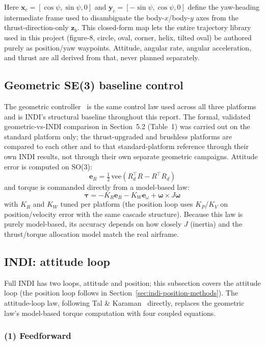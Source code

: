 \documentclass[11pt,a4paper]{article}
\begin{document}
Here $\mathbf{x}_c = [\cos\psi, \sin\psi, 0]$ and $\mathbf{y}_c = [-\sin\psi, \cos\psi, 0]$ define
the yaw-heading intermediate frame used to disambiguate the body-$x$/body-$y$ axes from the
thrust-direction-only $\mathbf{z}_b$. This closed-form map lets the entire trajectory library used
in this project (figure-8, circle, oval, corner, helix, tilted oval) be authored purely as
position/yaw waypoints. Attitude, angular rate, angular acceleration, and thrust are all derived
from that, never planned separately.

\subsection{Geometric SE(3) baseline control}

The geometric controller~\cite{lee2010} is the same control law used across all three platforms
and is INDI's structural baseline throughout this report. The formal, validated geometric-vs-INDI
comparison in Section~5.2 (Table~1) was carried out on the standard platform only; the
thrust-upgraded and brushless platforms are compared to each other and to that standard-platform
reference through their own INDI results, not through their own separate geometric campaigns.
Attitude error is computed on SO(3):
\[
  \mathbf{e}_R = \tfrac{1}{2}\,\mathrm{vee}\!\left(R_d^\top R - R^\top R_d\right)
\]
and torque is commanded directly from a model-based law:
\[
  \boldsymbol{\tau} = -K_R \mathbf{e}_R - K_W \mathbf{e}_\omega + \boldsymbol{\omega}\times J\boldsymbol{\omega}
\]
with $K_R$ and $K_W$ tuned per platform (the position loop uses $K_P$/$K_V$ on position/velocity
error with the same cascade structure). Because this law is purely model-based, its accuracy
depends on how closely $J$ (inertia) and the thrust/torque allocation model match the real
airframe.

\subsection{INDI: attitude loop}
\label{sec:indi-attitude-methods}

Full INDI has two loops, attitude and position; this subsection covers the attitude loop
(the position loop follows in Section~\ref{sec:indi-position-methods}). The attitude-loop law,
following Tal \& Karaman~\cite{tal2020} directly, replaces the geometric law's model-based torque
computation with four coupled equations.

\subsubsection{(1) Feedforward}
\end{document}
